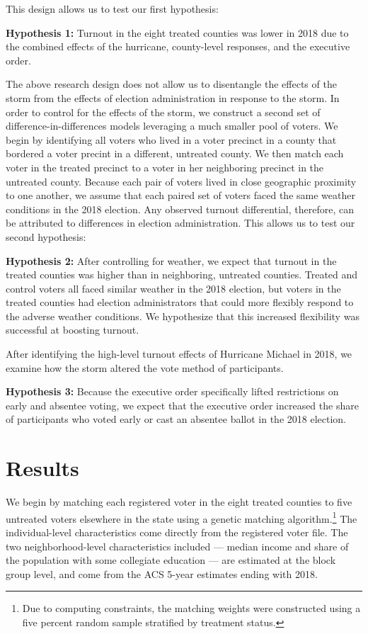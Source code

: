 \documentclass[
  12pt,
]{article}
\begin{document}
This design allows us to test our first hypothesis:

\textbf{Hypothesis 1:} Turnout in the eight treated counties was lower in 2018 due to the combined effects of the hurricane, county-level responses, and the executive order.

The above research design does not allow us to disentangle the effects of the storm from the effects of election administration in response to the storm. In order to control for the effects of the storm, we construct a second set of difference-in-differences models leveraging a much smaller pool of voters. We begin by identifying all voters who lived in a voter precinct in a county that bordered a voter precint in a different, untreated county. We then match each voter in the treated precinct to a voter in her neighboring precinct in the untreated county. Because each pair of voters lived in close geographic proximity to one another, we assume that each paired set of voters faced the same weather conditions in the 2018 election. Any observed turnout differential, therefore, can be attributed to differences in election administration. This allows us to test our second hypothesis:

\textbf{Hypothesis 2:} After controlling for weather, we expect that turnout in the treated counties was higher than in neighboring, untreated counties. Treated and control voters all faced similar weather in the 2018 election, but voters in the treated counties had election administrators that could more flexibly respond to the adverse weather conditions. We hypothesize that this increased flexibility was successful at boosting turnout.

After identifying the high-level turnout effects of Hurricane Michael in 2018, we examine how the storm altered the vote method of participants.

\textbf{Hypothesis 3:} Because the executive order specifically lifted restrictions on early and absentee voting, we expect that the executive order increased the share of participants who voted early or cast an absentee ballot in the 2018 election.

\hypertarget{results}{%
\section*{Results}\label{results}}

We begin by matching each registered voter in the eight treated counties to five untreated voters elsewhere in the state using a genetic matching algorithm.\footnote{Due to computing constraints, the matching weights were constructed using a five percent random sample stratified by treatment status.} The individual-level characteristics come directly from the registered voter file. The two neighborhood-level characteristics included --- median income and share of the population with some collegiate education --- are estimated at the block group level, and come from the ACS 5-year estimates ending with 2018.
\end{document}
